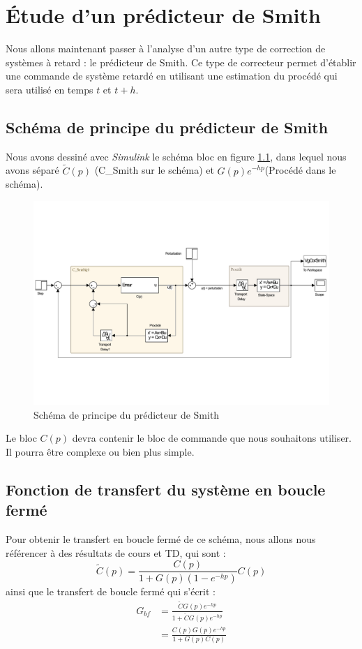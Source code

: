\chapter{Étude d'un prédicteur de Smith}
Nous allons maintenant passer à l'analyse d'un autre type de correction de systèmes à retard : le prédicteur de Smith. Ce type de correcteur permet d'établir une commande de système retardé en utilisant une estimation du procédé qui sera utilisé en temps $t$ et $t+h$.

\section{Schéma de principe du prédicteur de Smith}
Nous avons dessiné avec \emph{Simulink} le schéma bloc en figure \ref{fig:sch_predicteurSmith}, dans lequel nous avons séparé $\tilde{C}(p)$ (C\_Smith sur le schéma) et  $ G(p) e ^{-hp}$(Procédé dans le schéma).
\begin{figure}[!ht]
\centering
\includegraphics[width=\textwidth]{./IV/images/schema_Predicteur.pdf}
\caption{Schéma de principe du prédicteur de Smith}\label{fig:sch_predicteurSmith}
\end{figure}
Le bloc $C(p)$ devra contenir le bloc de commande que nous souhaitons utiliser. Il pourra être complexe ou bien plus simple.

\section{Fonction de transfert du système en boucle fermé}
Pour obtenir le transfert en boucle fermé de ce schéma, nous allons nous référencer à des résultats de cours et TD, qui sont : 
\begin{equation}
\tilde{C}(p) = \frac{C(p)}{1+G(p)\left(1-e^{-hp}\right)}C(p)	
\end{equation}
ainsi que le transfert de boucle fermé qui s'écrit :
\begin{align}
G_{bf} &= \frac{\tilde{C}G(p)e^{-hp}}{1+\tilde{C}G(p)e^{-hp}}\\
	   &= \frac{C(p)G(p)e^{-hp}}{1+G(p)C(p)}	
\end{align}

